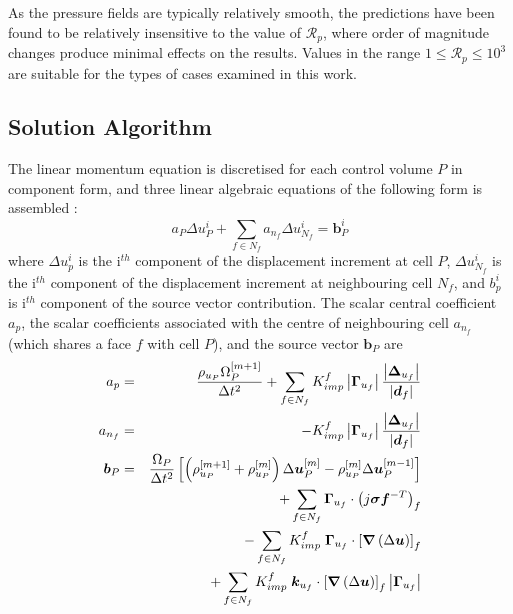 \documentclass[sn-mathphys,Numbered]{sn-jnl}%
\newcommand{\bb}{\boldsymbol}
\begin{document}
As the pressure fields are typically relatively smooth, the predictions have been found to be relatively insensitive to the value of $\mathcal{R}_p$, where order of magnitude changes produce minimal effects on the results.
Values in the range $1 \leq \mathcal{R}_p \leq 10^3$ are suitable for the types of cases examined in this work.


\subsection{Solution Algorithm}
The linear momentum equation is discretised for each control volume $P$ in component form, and three linear algebraic equations of the following form is assembled \cite{jasak_application_2000}:
\begin{equation}
a_P \Delta {u}_P^i + \sum_{f \in N_f}  a_{n_f} \Delta {u}_{N_f}^i = \bb{b}_P^i
\end{equation}
where $\Delta {u}_p^i$ is the i$^{th}$ component of the displacement increment at cell $P$, $\Delta {u}_{N_f}^i$ is the i$^{th}$ component of the displacement increment at neighbouring cell $N_f$, and ${b}_p^i$ is i$^{th}$ component of the source vector contribution.
The scalar central coefficient $a_{p}$, the scalar coefficients associated with the centre of neighbouring cell ${a}_{n_f}$ (which shares a face $f$ with cell $P$), and the source vector $\bb{b}_P$ are
\begin{eqnarray}
	{a}_p &=&
		\frac{\rho_{u_P} \mathrm{\Omega}_P^{[m+1]} }{\Delta t^2}	 	
		+ \sum_{f \in N_f} K_{imp}^f  \left|\bb{\Gamma}_{u_f}\right| \frac{ \left|\boldsymbol{\Delta}_{u_f}\right| }{\left|\bb{d}_f\right|} \\
	a_{n_f} &=&
		- K_{imp}^f  \left|\bb{\Gamma}_{u_f}\right| \frac{ \left|\boldsymbol{\Delta}_{u_f}\right| }{\left|\bb{d}_f\right|} \\
	\bb{b}_P &=&
		\frac{\mathrm{\Omega}_P}{\Delta t^2} \left[
		\left(\rho_{u_P}^{[m+1]} + \rho_{u_P}^{[m]} \right)  \Delta \bb{u}^{[m]}_P
		- \rho_{u_P}^{[m]}  \Delta \bb{u}^{[m-1]}_P 
		\right] \notag \\
		&&+ \sum_{f \in N_f} \bb{\Gamma}_{u_f} \cdot	\left(j\boldsymbol{\sigma} \bb{f}^{-T}\right)_f \notag \\
		&&- \sum_{f \in N_f} K_{imp}^f \; \bb{\Gamma}_{u_f} \cdot \left[\bb{\nabla}\left(\mathrm{\Delta}\bb{u}\right)\right]_f \notag \\
		&&+ \sum_{f \in N_f} K_{imp}^f \; \bb{k}_{u_f} \cdot
		    \left[
		    \boldsymbol{\nabla} \left(\mathrm{\Delta}\bb{u}\right)
		    \right]_f
		    \left|\bb{\Gamma}_{u_f}\right|
\end{eqnarray}
\end{document}
